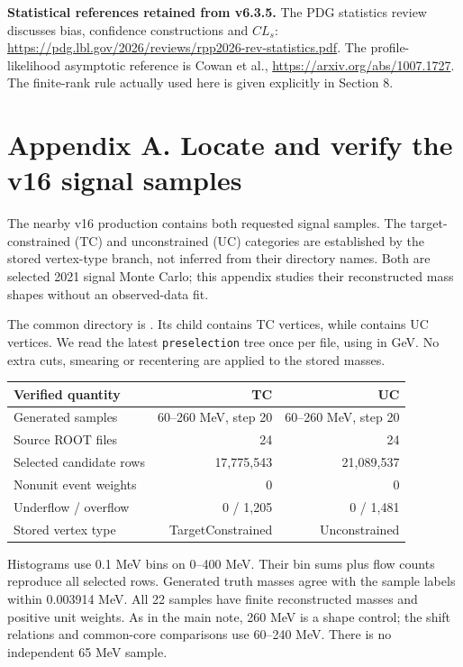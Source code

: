 \documentclass[11pt]{article}
\begin{document}
\textbf{Statistical references retained from v6.3.5.} The PDG statistics review discusses bias, confidence constructions and $CL_s$: \url{https://pdg.lbl.gov/2026/reviews/rpp2026-rev-statistics.pdf}. The profile-likelihood asymptotic reference is Cowan et al., \url{https://arxiv.org/abs/1007.1727}. The finite-rank rule actually used here is given explicitly in Section 8.
\clearpage\section*{Appendix A. Locate and verify the v16 signal samples}

The nearby v16 production contains both requested signal samples. The target-constrained (TC) and unconstrained (UC) categories are established by the stored vertex-type branch, not inferred from their directory names. Both are selected 2021 signal Monte Carlo; this appendix studies their reconstructed mass shapes without an observed-data fit.

The common directory is . Its  child contains TC vertices, while  contains UC vertices. We read the latest \texttt{preselection} tree once per file, using  in GeV. No extra cuts, smearing or recentering are applied to the stored masses.
\begin{center}\small\begin{tabular}{lrr}\toprule
Verified quantity & TC & UC\\\midrule
Generated samples & 60--260 MeV, step 20 & 60--260 MeV, step 20\\
Source ROOT files & 24 & 24\\
Selected candidate rows & 17,775,543 & 21,089,537\\
Nonunit event weights & 0 & 0\\
Underflow / overflow & 0 / 1,205 & 0 / 1,481\\
Stored vertex type & TargetConstrained & Unconstrained\\
\bottomrule\end{tabular}\end{center}
Histograms use 0.1 MeV bins on 0--400 MeV. Their bin sums plus flow counts reproduce all selected rows. Generated truth masses agree with the sample labels within 0.003914 MeV. All 22 samples have finite reconstructed masses and positive unit weights. As in the main note, 260 MeV is a shape control; the shift relations and common-core comparisons use 60--240 MeV. There is no independent 65 MeV sample.
\end{document}
